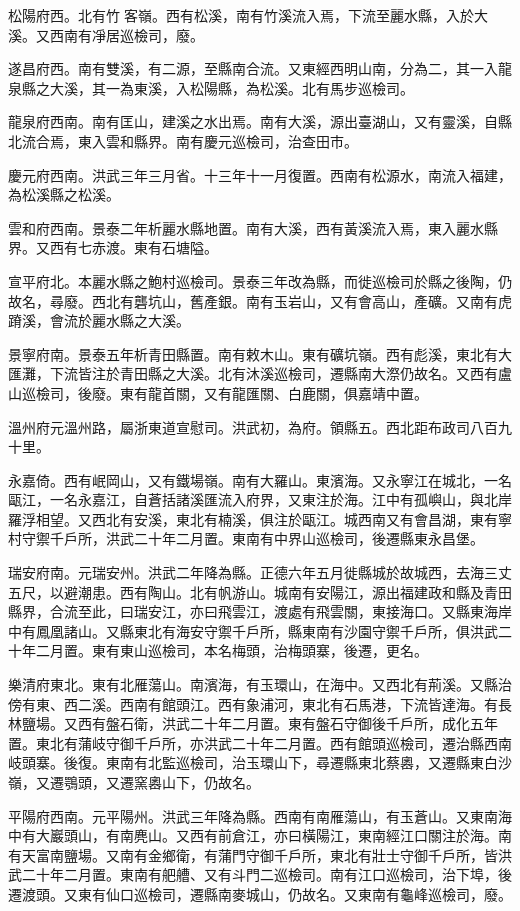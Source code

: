 松陽府西。北有竹客嶺。西有松溪，南有竹溪流入焉，下流至麗水縣，入於大溪。又西南有凈居巡檢司，廢。

遂昌府西。南有雙溪，有二源，至縣南合流。又東經西明山南，分為二，其一入龍泉縣之大溪，其一為東溪，入松陽縣，為松溪。北有馬步巡檢司。

龍泉府西南。南有匡山，建溪之水出焉。南有大溪，源出臺湖山，又有靈溪，自縣北流合焉，東入雲和縣界。南有慶元巡檢司，治查田市。

慶元府西南。洪武三年三月省。十三年十一月復置。西南有松源水，南流入福建，為松溪縣之松溪。

雲和府西南。景泰二年析麗水縣地置。南有大溪，西有黃溪流入焉，東入麗水縣界。又西有七赤渡。東有石塘隘。

宣平府北。本麗水縣之鮑村巡檢司。景泰三年改為縣，而徙巡檢司於縣之後陶，仍故名，尋廢。西北有礱坑山，舊產銀。南有玉岩山，又有會高山，產礦。又南有虎蹐溪，會流於麗水縣之大溪。

景寧府南。景泰五年析青田縣置。南有敕木山。東有礦坑嶺。西有彪溪，東北有大匯灘，下流皆注於青田縣之大溪。北有沐溪巡檢司，遷縣南大漈仍故名。又西有盧山巡檢司，後廢。東有龍首關，又有龍匯關、白鹿關，俱嘉靖中置。

溫州府元溫州路，屬浙東道宣慰司。洪武初，為府。領縣五。西北距布政司八百九十里。

永嘉倚。西有岷岡山，又有鐵場嶺。南有大羅山。東濱海。又永寧江在城北，一名甌江，一名永嘉江，自蒼括諸溪匯流入府界，又東注於海。江中有孤嶼山，與北岸羅浮相望。又西北有安溪，東北有楠溪，俱注於甌江。城西南又有會昌湖，東有寧村守禦千戶所，洪武二十年二月置。東南有中界山巡檢司，後遷縣東永昌堡。

瑞安府南。元瑞安州。洪武二年降為縣。正德六年五月徙縣城於故城西，去海三丈五尺，以避潮患。西有陶山。北有帆游山。城南有安陽江，源出福建政和縣及青田縣界，合流至此，曰瑞安江，亦曰飛雲江，渡處有飛雲關，東接海口。又縣東海岸中有鳳凰諸山。又縣東北有海安守禦千戶所，縣東南有沙園守禦千戶所，俱洪武二十年二月置。東有東山巡檢司，本名梅頭，治梅頭寨，後遷，更名。

樂清府東北。東有北雁蕩山。南濱海，有玉環山，在海中。又西北有荊溪。又縣治傍有東、西二溪。西南有館頭江。西有象浦河，東北有石馬港，下流皆達海。有長林鹽場。又西有盤石衛，洪武二十年二月置。東有盤石守御後千戶所，成化五年置。東北有蒲岐守御千戶所，亦洪武二十年二月置。西有館頭巡檢司，遷治縣西南岐頭寨。後復。東南有北監巡檢司，治玉環山下，尋遷縣東北蔡嶴，又遷縣東白沙嶺，又遷鶚頭，又遷窯嶴山下，仍故名。

平陽府西南。元平陽州。洪武三年降為縣。西南有南雁蕩山，有玉蒼山。又東南海中有大巖頭山，有南麂山。又西有前倉江，亦曰橫陽江，東南經江口關注於海。南有天富南鹽場。又南有金鄉衛，有蒲門守御千戶所，東北有壯士守御千戶所，皆洪武二十年二月置。東南有舥艚、又有斗門二巡檢司。南有江口巡檢司，治下埠，後遷渡頭。又東有仙口巡檢司，遷縣南麥城山，仍故名。又東南有龜峰巡檢司，廢。

